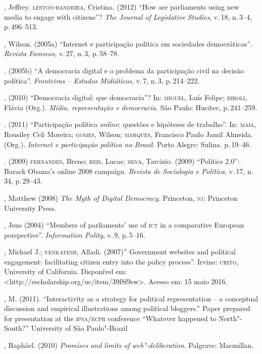 \begin{bibliohedra}
, Jeffrey. \textsc{leston}-\textsc{bandeira}, Cristina. (2012) ``How are
parliaments using new media to engage with citizens''? \emph{The Journal
of Legislative Studies}, v.\,18, n.\,3--4, p.\,496--513.

, Wilson. (2005a) ``Internet e participação política em sociedades
democráticas''\emph{. Revista Famecos,} v.\,27, n.\,3, p.\,58--78.

\titidem. (2005b) ``A democracia digital e o problema da
participação civil na decisão política''. \emph{Fronteiras -- Estudos
Midiáticos}, v.\,7, n.\,3, p.\,214--222.

\titidem. (2010) ``Democracia digital: que democracia''? In:
\textsc{miguel}, Luís Felipe; \textsc{biroli}, Flávia (Org.). \emph{Mídia, representação e
democracia}. São Paulo: Hucitec, p.\,241--259.

\titidem. (2011) ``Participação política \emph{online}: questões e
hipóteses de trabalho''. In: \textsc{maia}, Rousiley Celi Moreira; \textsc{gomes}, Wilson;
\textsc{marques}, Francisco Paulo Jamil Almeida. (Org.). \emph{Internet e
participação política no Brasil}. Porto Alegre: Sulina. p.\,19--46.

\titidem. (2009) \textsc{fernandes}, Breno; \textsc{reis}, Lucas; \textsc{silva}, Tarcizio.
(2009) ``Politics 2.0'': Barack Obama's online 2008 campaign.
\emph{Revista de Sociologia e Política}, v.\,17, n.\,34, p.\,29--43.

, Matthew (2008) \emph{The Myth of Digital Democracy}. Princeton,
\textsc{nj}: Princeton University Press.

, Jens (2004) ``Members of parliaments' use of \textsc{ict} in a comparative
European perspective''. \emph{Information Polity}, v.\,9, p.\,5--16.

, Michael J.; \textsc{venkatesh}, Alladi. (2007)'' Government websites and
political engagement: facilitating citizen entry into the policy
process''. Irvine: \textsc{crito}, University of California. Disponível em:
\textless{}http://escholarship.org/uc/item/39f8f9sw\textgreater{}.
Acesso em: 15 maio 2016.

, M. (2011). ``Interactivity as a strategy for political
representation -- a conceptual discussion and empirical illustrations
among political bloggers.'' Paper prepared for presentation at the
\textsc{ipsa}/\textsc{ecpr} conference ``Whatever happened to North"-South?'' University of
São Paulo"-Brazil

, Raphäel. (2010) \emph{Promises and limits of web"-deliberation}.
Palgrave: Macmillan.


\end{bibliohedra}
